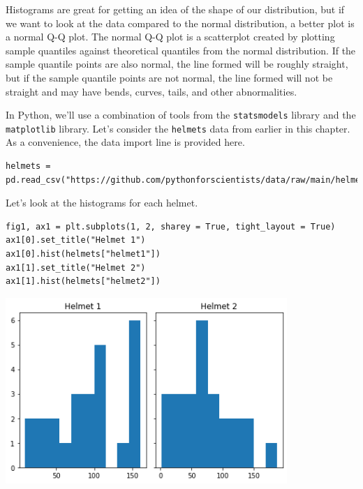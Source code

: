 Histograms are great for getting an idea of the shape of our distribution, but if we want to look at the data compared to the normal distribution, a better plot is a normal Q-Q plot. The normal Q-Q plot is a scatterplot created by plotting sample quantiles against theoretical quantiles from the normal distribution. If the sample quantile points are also normal, the line formed will be roughly straight, but if the sample quantile points are not normal, the line formed will not be straight and may have bends, curves, tails, and other abnormalities.\par
In Python, we'll use a combination of tools from the \verb|statsmodels| library and the \verb|matplotlib| library. Let's consider the \verb|helmets| data from earlier in this chapter. As a convenience, the data import line is provided here.\par
\begin{lstlisting}[style=pippython]
helmets = pd.read_csv("https://github.com/pythonforscientists/data/raw/main/helmets.csv")
\end{lstlisting}
Let's look at the histograms for each helmet.\par
\begin{lstlisting}[style=pippython]
fig1, ax1 = plt.subplots(1, 2, sharey = True, tight_layout = True)
ax1[0].set_title("Helmet 1")
ax1[0].hist(helmets["helmet1"])
ax1[1].set_title("Helmet 2")
ax1[1].hist(helmets["helmet2"])
\end{lstlisting}

\includegraphics[width = 0.8\textwidth]{img/hist5.png}

